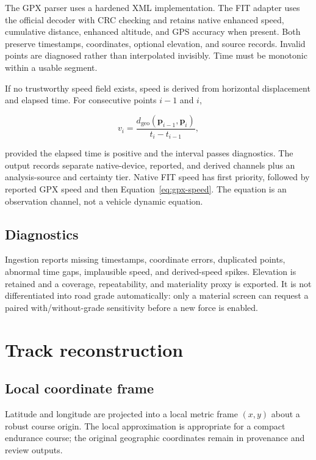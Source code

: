 \documentclass[11pt,oneside]{report}
\begin{document}
The GPX parser uses a hardened XML implementation.  The FIT adapter uses the official
decoder with CRC checking and retains native enhanced speed, cumulative distance,
enhanced altitude, and GPS accuracy when present.  Both preserve timestamps,
coordinates, optional elevation, and source records. Invalid points are diagnosed
rather than interpolated invisibly. Time must be monotonic within a usable segment.

If no trustworthy speed field exists, speed is derived from horizontal displacement and
elapsed time.  For consecutive points $i-1$ and $i$,

\begin{equation}
v_i = \frac{d_{\mathrm{geo}}(\mathbf{p}_{i-1},\mathbf{p}_i)}
             {t_i-t_{i-1}},
\label{eq:gpx-speed}
\end{equation}

provided the elapsed time is positive and the interval passes diagnostics. The output
records separate native-device, reported, and derived channels plus an analysis-source
and certainty tier. Native FIT speed has first priority, followed by reported GPX speed
and then Equation~\eqref{eq:gpx-speed}. The equation is an observation channel, not a
vehicle dynamic equation.

\section{Diagnostics}

Ingestion reports missing timestamps, coordinate errors, duplicated points, abnormal
time gaps, implausible speed, and derived-speed spikes. Elevation is retained and a
coverage, repeatability, and materiality proxy is exported. It is not differentiated
into road grade automatically: only a material screen can request a paired
with/without-grade sensitivity before a new force is enabled.

\chapter{Track reconstruction}\label{ch:track}

\section{Local coordinate frame}

Latitude and longitude are projected into a local metric frame $(x,y)$ about a robust
course origin.  The local approximation is appropriate for a compact endurance course;
the original geographic coordinates remain in provenance and review outputs.
\end{document}
